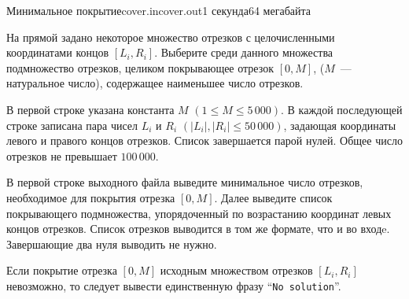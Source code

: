 \begin{problem}{Минимальное покрытие}{cover.in}{cover.out}{1 секунда}{64 мегабайта}

На прямой задано некоторое множество отрезков  с целочисленными координатами концов 
$[L_i, R_i]$. Выберите среди данного множества подмножество отрезков, целиком 
покрывающее отрезок $[0, M]$, ($M$~--- натуральное число), содержащее наименьшее
число отрезков.

\InputFile

В первой строке указана константа $M$ $(1 \leqslant M \leqslant 5\,000)$. В 
каждой последующей строке записана пара чисел $L_i$ и $R_i$ 
$(|L_i|, |R_i| \leqslant 50\,000)$, задающая координаты левого и правого концов отрезков.
Список завершается  парой нулей. Общее число отрезков не превышает $100\,000$.

\OutputFile
В первой строке выходного файла выведите минимальное число отрезков,
необходимое для покрытия отрезка $[0, M]$.
Далее выведите список покрывающего подмножества, упорядоченный по 
возрастанию координат левых концов отрезков. Список отрезков выводится в том же 
формате, что и во входe. Завершающие два нуля выводить не нужно.

Если покрытие отрезка $[0, M]$ исходным множеством отрезков $[L_i, R_i]$ 
невозможно, то следует вывести единственную фразу ``\verb"No solution"''.

\Examples

\begin{example}
%
%
\end{example}

\end{problem}

